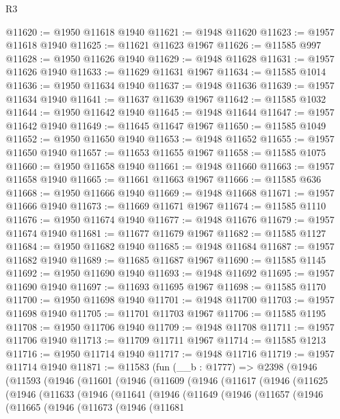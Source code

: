 \begin{lexlean}{R3}
\begin{coremodule}
@11620 := @1950 @11618 @1940
@11621 := @1948 @11620
@11623 := @1957 @11618 @1940
@11625 := @11621 @11623 @1967
@11626 := @11585 @997
@11628 := @1950 @11626 @1940
@11629 := @1948 @11628
@11631 := @1957 @11626 @1940
@11633 := @11629 @11631 @1967
@11634 := @11585 @1014
@11636 := @1950 @11634 @1940
@11637 := @1948 @11636
@11639 := @1957 @11634 @1940
@11641 := @11637 @11639 @1967
@11642 := @11585 @1032
@11644 := @1950 @11642 @1940
@11645 := @1948 @11644
@11647 := @1957 @11642 @1940
@11649 := @11645 @11647 @1967
@11650 := @11585 @1049
@11652 := @1950 @11650 @1940
@11653 := @1948 @11652
@11655 := @1957 @11650 @1940
@11657 := @11653 @11655 @1967
@11658 := @11585 @1075
@11660 := @1950 @11658 @1940
@11661 := @1948 @11660
@11663 := @1957 @11658 @1940
@11665 := @11661 @11663 @1967
@11666 := @11585 @636
@11668 := @1950 @11666 @1940
@11669 := @1948 @11668
@11671 := @1957 @11666 @1940
@11673 := @11669 @11671 @1967
@11674 := @11585 @1110
@11676 := @1950 @11674 @1940
@11677 := @1948 @11676
@11679 := @1957 @11674 @1940
@11681 := @11677 @11679 @1967
@11682 := @11585 @1127
@11684 := @1950 @11682 @1940
@11685 := @1948 @11684
@11687 := @1957 @11682 @1940
@11689 := @11685 @11687 @1967
@11690 := @11585 @1145
@11692 := @1950 @11690 @1940
@11693 := @1948 @11692
@11695 := @1957 @11690 @1940
@11697 := @11693 @11695 @1967
@11698 := @11585 @1170
@11700 := @1950 @11698 @1940
@11701 := @1948 @11700
@11703 := @1957 @11698 @1940
@11705 := @11701 @11703 @1967
@11706 := @11585 @1195
@11708 := @1950 @11706 @1940
@11709 := @1948 @11708
@11711 := @1957 @11706 @1940
@11713 := @11709 @11711 @1967
@11714 := @11585 @1213
@11716 := @1950 @11714 @1940
@11717 := @1948 @11716
@11719 := @1957 @11714 @1940
@11871 := @11583
    (fun (__b : @1777) =>
    @2398
      (@1946
        (@11593
          (@1946
            (@11601
              (@1946
                (@11609
                  (@1946
                    (@11617
                      (@1946
                        (@11625
                          (@1946
                            (@11633
                              (@1946
                                (@11641
                                  (@1946
                                    (@11649
                                      (@1946
                                        (@11657
                                          (@1946
                                            (@11665
                                              (@1946
                                                (@11673
                                                  (@1946
                                                    (@11681

\end{coremodule}
\end{lexlean}
